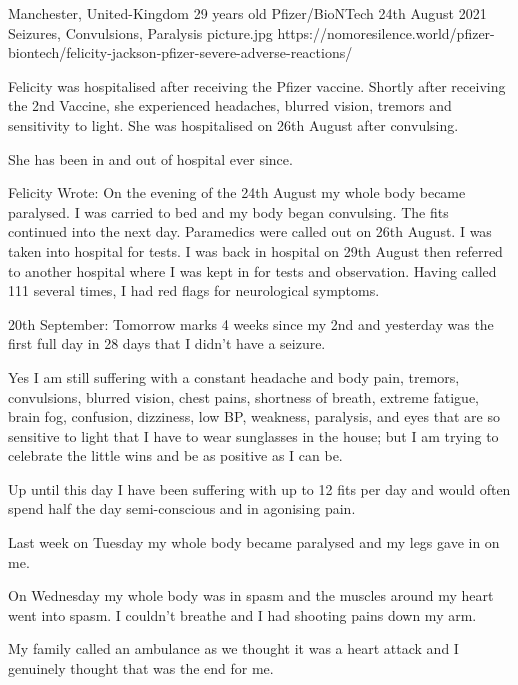 {Manchester, United-Kingdom}
{29 years old}
{Pfizer/BioNTech}
{24th August 2021}
{Seizures, Convulsions, Paralysis}
{picture.jpg}
{https://nomoresilence.world/pfizer-biontech/felicity-jackson-pfizer-severe-adverse-reactions/}
{

Felicity was hospitalised after receiving the Pfizer vaccine. Shortly after
receiving the 2nd Vaccine, she experienced headaches, blurred vision, tremors
and sensitivity to light. She was hospitalised on 26th August after convulsing.

She has been in and out of hospital ever since.

Felicity Wrote: On the evening of the 24th August my whole body became
paralysed. I was carried to bed and my body began convulsing. The fits continued
into the next day. Paramedics were called out on 26th August. I was taken into
hospital for tests. I was back in hospital on 29th August then referred to
another hospital where I was kept in for tests and observation. Having called
111 several times, I had red flags for neurological symptoms.

20th September: Tomorrow marks 4 weeks since my 2nd and yesterday was the first
full day in 28 days that I didn’t have a seizure.

Yes I am still suffering with a constant headache and body pain, tremors,
convulsions, blurred vision, chest pains, shortness of breath, extreme fatigue,
brain fog, confusion, dizziness, low BP, weakness, paralysis, and eyes that are
so sensitive to light that I have to wear sunglasses in the house; but I am
trying to celebrate the little wins and be as positive as I can be.

Up until this day I have been suffering with up to 12 fits per day and would
often spend half the day semi-conscious and in agonising pain.

Last week on Tuesday my whole body became paralysed and my legs gave in on me.

On Wednesday my whole body was in spasm and the muscles around my heart went
into spasm. I couldn’t breathe and I had shooting pains down my arm.

My family called an ambulance as we thought it was a heart attack and I
genuinely thought that was the end for me.

}
